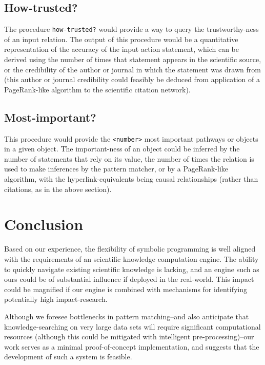 \documentclass[11pt]{article}
\begin{document}
\subsection{How-trusted?}
\label{sec-4-4}
The procedure \texttt{how-trusted?} would provide a way to query the trustworthy-ness of an input relation. The output of this procedure would be a quantitative representation of the accuracy of the input action statement, which can be derived using the number of times that statement appears in the scientific source, or the credibility of the author or journal in which the statement was drawn from (this author or journal credibility could feasibly be deduced from application of a PageRank-like algorithm to the scientific citation network).
\subsection{Most-important?}
\label{sec-4-5}
This procedure would provide the \texttt{<number>} most important pathways or objects in a given object. The important-ness of an object could be inferred by the number of statements that rely on its value, the number of times the relation is used to make inferences by the pattern matcher, or by a PageRank-like algorithm, with the hyperlink-equivalents being causal relationships (rather than citations, as in the above section).
\section{Conclusion}
\label{sec-5}
Based on our experience, the flexibility of symbolic programming is well aligned with the requirements of an scientific knowledge computation engine. The ability to quickly navigate existing scientific knowledge is lacking, and an engine such as ours could be of substantial influence if deployed in the real-world. This impact could be magnified if our engine is combined with mechanisms for identifying potentially high impact-research.

Although we foresee bottlenecks in pattern matching--and also anticipate that knowledge-searching on very large data sets will require significant computational resources (although this could be mitigated with intelligent pre-processing)--our work serves as a minimal proof-of-concept implementation, and suggests that the development of such a system is feasible.
\end{document}
